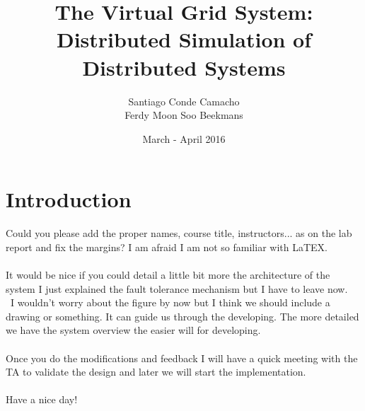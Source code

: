 \documentclass{article}
\title{The Virtual Grid System: Distributed Simulation of Distributed Systems}
\author{Santiago Conde Camacho \\ Ferdy Moon Soo Beekmans}
\date{March - April 2016}
\begin{document}
\maketitle

\section{Introduction}
Could you please add the proper names, course title, instructors... as on the lab report and fix the margins? I am afraid I am not so familiar with LaTEX.
\\\\
It would be nice if you could detail a little bit more the architecture of the system I just explained the fault tolerance mechanism but I have to leave now.
\\\
I wouldn't worry about the figure by now but I think we should include a drawing or something. It can guide us through the developing. The more detailed we have the system overview the easier will for developing.
\\\\ 
Once you do the modifications and feedback I will have a quick meeting with the TA to validate the design and later we will start the implementation.
\\\\
Have a nice day! 
\end{document}
